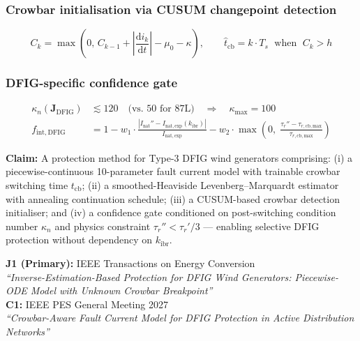 \documentclass[12pt, a4paper]{report}
\newcommand{\mat}[1]{\mathbf{#1}}
\begin{document}
\subsubsection{Crowbar initialisation via CUSUM changepoint detection}

\begin{equation}
  C_k = \max\!\left(0,\, C_{k-1} + \left|\frac{\mathrm{d}i_k}{\mathrm{d}t}\right| - \mu_0 - \kappa\right),
  \qquad \hat{t}_\mathrm{cb} = k \cdot T_s \;\text{ when }\; C_k > h
\end{equation}

\subsubsection{DFIG-specific confidence gate}

\begin{tcolorbox}[mathbox]
\begin{align}
  \kappa_n(\mat{J}_\mathrm{DFIG}) &\lesssim 120 \quad\text{(vs.\ 50 for 87L)}
  \quad\Rightarrow\quad \kappa_\mathrm{max} = 100 \\[4pt]
  f_\mathrm{int,DFIG} &= 1 - w_1\cdot\frac{|I_\mathrm{nat}'' - I_\mathrm{nat,exp}(k_\mathrm{ibr})|}{I_\mathrm{nat,exp}}
                         - w_2\cdot\max\!\left(0,\;\frac{\tau_r'' - \tau_{r,\mathrm{cb,max}}}{\tau_{r,\mathrm{cb,max}}}\right)
\end{align}
\end{tcolorbox}

\begin{tcolorbox}[ipbox, title={IP — Patent Family P1}]
\textbf{Claim:} A protection method for Type-3 DFIG wind generators comprising: (i) a piecewise-continuous 10-parameter fault current model with trainable crowbar switching time $t_\mathrm{cb}$; (ii) a smoothed-Heaviside Levenberg--Marquardt estimator with annealing continuation schedule; (iii) a CUSUM-based crowbar detection initialiser; and (iv) a confidence gate conditioned on post-switching condition number $\kappa_n$ and physics constraint $\tau_r'' < \tau_r'/3$ — enabling selective DFIG protection without dependency on $k_\mathrm{ibr}$.
\end{tcolorbox}

\begin{tcolorbox}[pubbox, title={Publications — TR-56}]
\textbf{J1 (Primary):} IEEE Transactions on Energy Conversion\\
\textit{``Inverse-Estimation-Based Protection for DFIG Wind Generators: Piecewise-ODE Model with Unknown Crowbar Breakpoint''}\\[4pt]
\textbf{C1:} IEEE PES General Meeting 2027\\
\textit{``Crowbar-Aware Fault Current Model for DFIG Protection in Active Distribution Networks''}
\end{tcolorbox}
\end{document}
